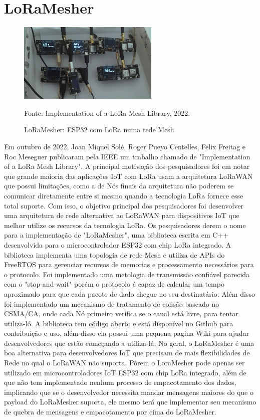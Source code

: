 \newpage

\section{LoRaMesher}

\begin{figure}[H]
    \centering
	\caption{LoRaMesher: ESP32 com LoRa numa rede Mesh}
    \includegraphics[width=0.6\textwidth]{img/loramesher.png}
    \label{fig:loramesher}
    
    Fonte: Implementation of a LoRa Mesh Library, 2022.
\end{figure}

Em outubro de 2022, Joan Miquel Solé, Roger Pueyo Centelles, Felix Freitag e Roc Meseguer publicaram
pela IEEE um trabalho chamado de "Implementation of a LoRa Mesh Library". A principal motivação dos
pesquisadores foi em notar que grande maioria das aplicações IoT com LoRa usam a arquitetura LoRaWAN
que possui limitações, como a de Nós finais da arquitetura não poderem se comunicar diretamente entre si mesmo quando a tecnologia LoRa fornece esse total suporte. Com isso, o objetivo principal dos
pesquisadores foi desenvolver uma arquitetura de rede alternativa ao LoRaWAN para dispositivos IoT
que melhor utilize os recursos da tecnologia LoRa. Os pesquisadores derem o nome para a implementação
de "LoRaMesher", uma biblioteca escrita em C++ desenvolvida para o microcontrolador ESP32 com chip LoRa
integrado. A biblioteca implementa uma topologia de rede Mesh e utiliza de APIs do FreeRTOS para
gerenciar recursos de memorias e processamento necessários para o protocolo. Foi implementado uma
metologia de transmissão confiável parecida com o "stop-and-wait" porém o protocolo é capaz de
calcular um tempo aproximado para que cada pacote de dado chegue no seu destinatário. Além disso foi
implementado um mecanismo de tratamento de colisão baseado no CSMA/CA, onde cada Nó primeiro verifica
se o canal está livre, para tentar utiliza-ló. A biblioteca tem código aberto e está disponível no Github para contribuição e uso, além disso ela possui uma pequena pagina Wiki para ajudar desenvolvedores que estão começando a utiliza-lá. No geral, o LoRaMesher é uma boa alternativa
para desenvolvedores IoT que precisam de mais flexibilidades de Rede no qual o LoRaWAN não suporta.
Pórem o LoraMesher pode apenas ser utilizado em microcontroladores IoT ESP32 com chip LoRa integrado,
além de que não tem implementado nenhum processo de empacotamento dos dados, implicando que se o
desenvolvedor necessita mandar mensagens maiores do que o payload do LoRaMesher suporta, ele
mesmo terá que implementar seu mecanismo de quebra de mensagens e empacotamento por cima do
LoRaMesher. \cite{9930341}


